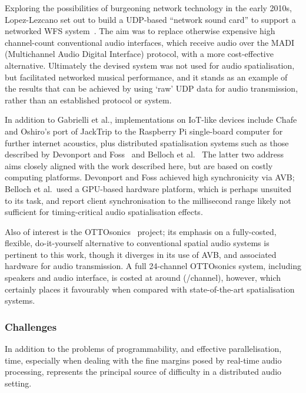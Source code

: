 Exploring the possibilities of burgeoning network technology in the early 2010s,
Lopez-Lezcano set out to build a UDP-based ``network sound card'' to support
a networked WFS system~\citep{lopez-lezcano_jack_2012}.
The aim was to replace otherwise expensive high channel-count conventional
audio interfaces, which receive audio over the MADI (Multichannel Audio Digital
Interface) protocol, with a more cost-effective alternative.
Ultimately the devised system was not used for audio spatialisation, but
facilitated networked musical performance, and it stands as an example of the
results that can be achieved by using `raw' UDP data for audio transmission,
rather than an established protocol or system.

In addition to Gabrielli et al., implementations on IoT-like devices include
Chafe and Oshiro's port of JackTrip to the Raspberry Pi single-board computer
for further internet acoustics, plus distributed spatialisation systems such as
those described by Devonport and Foss~\citep{devonport_distribution_2019} and
Belloch et al.~\citep{belloch_performance_2021}
The latter two address aims closely aligned with the work described here, but
are based on costly computing platforms.
Devonport and Foss achieved high synchronicity via AVB; Belloch et al.\ used a
GPU-based hardware platform, which is perhaps unsuited to its task, and report
client synchronisation to the millisecond range \textemdash{} likely not
sufficient for timing-critical audio spatialisation effects.

Also of interest is the OTTOsonics~\citep{mitterhuber_ottosonics_2022}
project;
its emphasis on a fully-costed, flexible, do-it-yourself alternative to
conventional spatial audio systems is pertinent to this work, though it diverges
in its use of AVB, and associated hardware for audio transmission.
A full 24-channel OTTOsonics system, including speakers and audio interface, is
costed at around  (/channel), however, which
certainly places it favourably when compared with state-of-the-art
spatialisation systems.

\subsubsection{Challenges}\label{subsubsec:challenges}

In addition to the problems of programmability, and effective parallelisation,
time, especially when dealing with the fine margins posed by real-time audio
processing, represents the principal source of difficulty in a distributed
audio setting.

